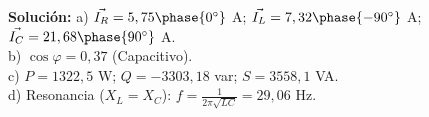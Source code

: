 \documentclass[
  a4paper,
  DIV=11,
  numbers=noendperiod]{scrreprt}
\begin{document}
\begin{tcolorbox}[enhanced jigsaw, breakable, colback=white, left=2mm, leftrule=.75mm, rightrule=.15mm, toprule=.15mm, colframe=quarto-callout-note-color-frame, arc=.35mm, bottomrule=.15mm, opacityback=0]

\textbf{Solución:} a) \(\vec{I_R} = 5,75\phase{0^{\circ}}\) A;
\(\vec{I_L} = 7,32\phase{-90^{\circ}}\) A;
\(\vec{I_C} = 21,68\phase{90^{\circ}}\) A.\\
b) \(\cos\varphi = 0,37\) (Capacitivo).\\
c) \(P = 1322,5\) W; \(Q = -3303,18\) var; \(S = 3558,1\) VA.\\
d) Resonancia (\(X_L = X_C\)): \(f = \frac{1}{2\pi\sqrt{LC}} = 29,06\)
Hz.

\end{tcolorbox}
\end{document}
